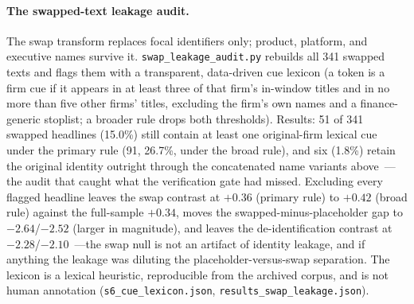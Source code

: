 \paragraph{The swapped-text leakage audit.} The swap transform replaces focal identifiers only; product, platform, and executive names survive it. \texttt{swap\_leakage\_audit.py} rebuilds all 341 swapped texts and flags them with a transparent, data-driven cue lexicon (a token is a firm cue if it appears in at least three of that firm's in-window titles and in no more than five other firms' titles, excluding the firm's own names and a finance-generic stoplist; a broader rule drops both thresholds). Results: 51 of 341 swapped headlines (15.0\%) still contain at least one original-firm lexical cue under the primary rule (91, 26.7\%, under the broad rule), and six (1.8\%) retain the original identity outright through the concatenated name variants above~---the audit that caught what the verification gate had missed. Excluding every flagged headline leaves the swap contrast at $+0.36$ (primary rule) to $+0.42$ (broad rule) against the full-sample $+0.34$, moves the swapped-minus-placeholder gap to $-2.64$/$-2.52$ (larger in magnitude), and leaves the de-identification contrast at $-2.28$/$-2.10$~---the swap null is not an artifact of identity leakage, and if anything the leakage was diluting the placeholder-versus-swap separation. The lexicon is a lexical heuristic, reproducible from the archived corpus, and is not human annotation (\texttt{s6\_cue\_lexicon.json}, \texttt{results\_swap\_leakage.json}).

